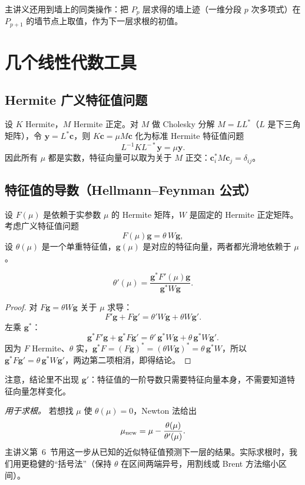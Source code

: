 \documentclass[11pt,a4paper,fontset=fandol]{ctexart}
\begin{document}
主讲义还用到墙上的同类操作：把 $P_p$ 层求得的墙上迹（一维分段 $p$ 次多项式）在 $P_{p+1}$ 的墙节点上取值，作为下一层求根的初值。

\section{几个线性代数工具}
\label{sec:linalg}

\subsection{Hermite 广义特征值问题}

设 $K$ Hermite，$M$ Hermite 正定。对 $M$ 做 Cholesky 分解 $M=LL^*$（$L$ 是下三角矩阵），令 $\bm y=L^*\bm c$，则 $K\bm c=\mu M\bm c$ 化为标准 Hermite 特征值问题
\[
L^{-1}KL^{-*}\bm y=\mu\bm y .
\]
因此所有 $\mu$ 都是实数，特征向量可以取为关于 $M$ 正交：$\bm c_i^*M\bm c_j=\delta_{ij}$。

\subsection{特征值的导数（Hellmann--Feynman 公式）}
\label{sec:hf}

设 $F(\mu)$ 是依赖于实参数 $\mu$ 的 Hermite 矩阵，$W$ 是固定的 Hermite 正定矩阵。考虑广义特征值问题
\[
F(\mu)\bm g=\theta\,W\bm g ,
\]
设 $\theta(\mu)$ 是一个单重特征值，$\bm g(\mu)$ 是对应的特征向量，两者都光滑地依赖于 $\mu$。

\begin{proposition}
\label{prop:hf}
\[
\theta'(\mu)=\frac{\bm g^*F'(\mu)\bm g}{\bm g^*W\bm g}.
\]
\end{proposition}

\begin{proof}
对 $F\bm g=\theta W\bm g$ 关于 $\mu$ 求导：
\[
F'\bm g+F\bm g'=\theta'W\bm g+\theta W\bm g' .
\]
左乘 $\bm g^*$：
\[
\bm g^*F'\bm g+\bm g^*F\bm g'=\theta'\,\bm g^*W\bm g+\theta\,\bm g^*W\bm g' .
\]
因为 $F$ Hermite、$\theta$ 实，$\bm g^*F=(F\bm g)^*=(\theta W\bm g)^*=\theta\,\bm g^*W$，所以 $\bm g^*F\bm g'=\theta\,\bm g^*W\bm g'$，两边第二项相消，即得结论。
\end{proof}

注意，结论里不出现 $\bm g'$：特征值的一阶导数只需要特征向量本身，不需要知道特征向量怎样变化。

\emph{用于求根。} 若想找 $\mu$ 使 $\theta(\mu)=0$，Newton 法给出
\[
\mu_{\rm new}=\mu-\frac{\theta(\mu)}{\theta'(\mu)} .
\]
主讲义第~6~节用这一步从已知的近似特征值预测下一层的结果。实际求根时，我们用更稳健的“括号法”（保持 $\theta$ 在区间两端异号，用割线或 Brent 方法缩小区间）。
\end{document}
